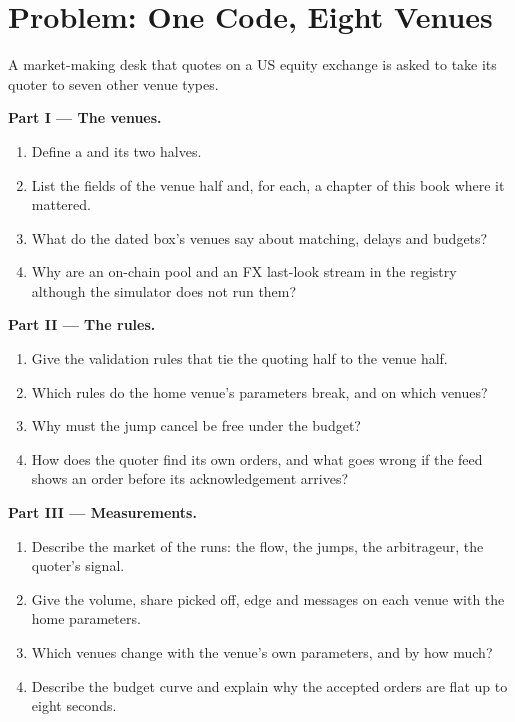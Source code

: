 \section{Problem: One Code, Eight Venues}

\begin{problem}\label{pb:hf:a-venue-playbook:1}
A market-making desk that quotes on a US equity exchange is asked to take its quoter to seven other venue types.

\medskip\noindent\textbf{Part I --- The venues.}
\begin{enumerate}
\item Define a  and its two halves.
\item List the fields of the venue half and, for each, a chapter of this book where it mattered.
\item What do the dated box's venues say about matching, delays and budgets?
\item Why are an on-chain pool and an FX last-look stream in the registry although the simulator does not run them?
\end{enumerate}

\medskip\noindent\textbf{Part II --- The rules.}
\begin{enumerate}[resume]
\item Give the validation rules that tie the quoting half to the venue half.
\item Which rules do the home venue's parameters break, and on which venues?
\item Why must the jump cancel be free under the budget?
\item How does the quoter find its own orders, and what goes wrong if the feed shows an order before its acknowledgement arrives?
\end{enumerate}

\medskip\noindent\textbf{Part III --- Measurements.}
\begin{enumerate}[resume]
\item Describe the market of the runs: the flow, the jumps, the arbitrageur, the quoter's signal.
\item Give the volume, share picked off, edge and messages on each venue with the home parameters.
\item Which venues change with the venue's own parameters, and by how much?
\item Describe the budget curve and explain why the accepted orders are flat up to eight seconds.
\end{enumerate}


\end{problem}
